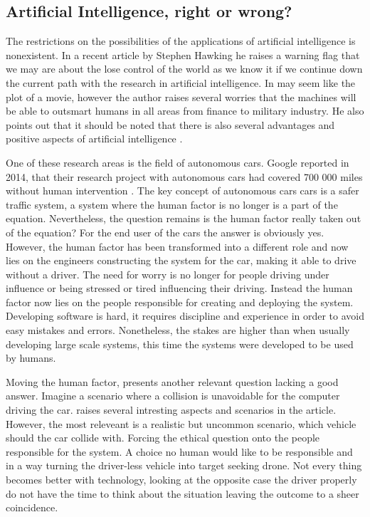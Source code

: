 \subsection{Artificial Intelligence, right or wrong? }
\label{sec:hawkins}
The restrictions on the possibilities of the applications of artificial intelligence is nonexistent. In a recent article by Stephen Hawking he raises a warning flag that we may are about the lose control of the world as we know it if we continue down the current path with the research in artificial intelligence. In may seem like the plot of a movie, however the author raises several worries that the machines will be able to outsmart humans in all areas from finance to military industry. He also points out that it should be noted that there is also several advantages and positive aspects of artificial intelligence \parencite{Hawking:Online}. 

One of these research areas is the field of autonomous cars. Google reported in 2014, that their research project with autonomous cars had covered 700 000 miles without human intervention \parencite{Urmson2014:Online}. The key concept of autonomous cars cars is a safer traffic system, a system where the human factor is no longer is a part of the equation. Nevertheless, the question remains is the human factor really taken out of the equation? For the end user of the cars the answer is obviously yes. However, the human factor has been transformed into a different role and now lies on the engineers constructing the system for the car, making it able to drive without a driver. The need for worry is no longer for people driving under influence or being stressed or tired influencing their driving. Instead the human factor now lies on the people responsible for creating and deploying the system. Developing software is hard, it requires discipline and experience in order to avoid easy mistakes and errors. Nonetheless, the stakes are higher than when usually developing large scale systems, this time the systems were developed to be used by humans. 

Moving the human factor, presents another relevant question lacking a good answer. Imagine a scenario where a collision is unavoidable for the computer driving the car. \textcite{Lin:Online} raises several intresting aspects and scenarios in the article. However, the most releveant is a realistic but uncommon scenario, which vehicle should the car collide with. Forcing the ethical question onto the people responsible for the system. A choice no human would like to be responsible and in a way turning the driver-less vehicle into target seeking drone. Not every thing becomes better with technology, looking at the opposite case the driver properly do not have the time to think about the situation leaving the outcome to a sheer coincidence.